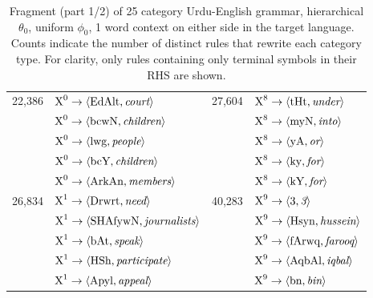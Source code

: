 \begin{table}[h]
\caption{Fragment (part 1/2) of 25 category Urdu-English grammar, hierarchical $\theta_0$, uniform $\phi_0$, 1 word context on either side in the target language. Counts indicate the number of distinct rules that rewrite each category type. For clarity, only rules containing only terminal symbols in their RHS are shown.}
\begin{center}
\begin{tabular}{|c|l|c|l|}
\hline
22,386 & $ \textrm{X}^{0} \rightarrow \langle \textrm{EdAlt},\textrm{{\emph court}} \rangle $ &27,604 & $ \textrm{X}^{8} \rightarrow \langle \textrm{tHt},\textrm{{\emph under}} \rangle $ \\
 & $ \textrm{X}^{0} \rightarrow \langle \textrm{bcwN},\textrm{{\emph children}} \rangle $ & & $ \textrm{X}^{8} \rightarrow \langle \textrm{myN},\textrm{{\emph into}} \rangle $ \\
 & $ \textrm{X}^{0} \rightarrow \langle \textrm{lwg},\textrm{{\emph people}} \rangle $ & & $ \textrm{X}^{8} \rightarrow \langle \textrm{yA},\textrm{{\emph or}} \rangle $ \\
 & $ \textrm{X}^{0} \rightarrow \langle \textrm{bcY},\textrm{{\emph children}} \rangle $ & & $ \textrm{X}^{8} \rightarrow \langle \textrm{ky},\textrm{{\emph for}} \rangle $ \\
 & $ \textrm{X}^{0} \rightarrow \langle \textrm{ArkAn},\textrm{{\emph members}} \rangle $ & & $ \textrm{X}^{8} \rightarrow \langle \textrm{kY},\textrm{{\emph for}} \rangle $ \\
\hline
26,834 & $ \textrm{X}^{1} \rightarrow \langle \textrm{Drwrt},\textrm{{\emph need}} \rangle $ &40,283 & $ \textrm{X}^{9} \rightarrow \langle \textrm{3},\textrm{{\emph 3}} \rangle $ \\
 & $ \textrm{X}^{1} \rightarrow \langle \textrm{SHAfywN},\textrm{{\emph journalists}} \rangle $ & & $ \textrm{X}^{9} \rightarrow \langle \textrm{Hsyn},\textrm{{\emph hussein}} \rangle $ \\
 & $ \textrm{X}^{1} \rightarrow \langle \textrm{bAt},\textrm{{\emph speak}} \rangle $ & & $ \textrm{X}^{9} \rightarrow \langle \textrm{fArwq},\textrm{{\emph farooq}} \rangle $ \\
 & $ \textrm{X}^{1} \rightarrow \langle \textrm{HSh},\textrm{{\emph participate}} \rangle $ & & $ \textrm{X}^{9} \rightarrow \langle \textrm{AqbAl},\textrm{{\emph iqbal}} \rangle $ \\
 & $ \textrm{X}^{1} \rightarrow \langle \textrm{Apyl},\textrm{{\emph appeal}} \rangle $ & & $ \textrm{X}^{9} \rightarrow \langle \textrm{bn},\textrm{{\emph bin}} \rangle $ \\

\end{tabular}
\end{center}
\end{table}
